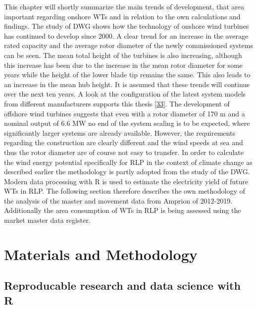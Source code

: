 \documentclass[a4paper,11pt]{article}
\begin{document}
This chapter will shortly summarize the main trends of development, that area important regarding onshore WTs and in relation to the own calculations and findings. The study of DWG shows how the technology of onshore wind turbines has continued to develop since 2000. A clear trend for an increase in the average rated capacity and the average rotor diameter of the newly commissioned systems can be seen. The mean total height of the turbines is also increasing, although this increase has been due to the increase in the mean rotor diameter for some years while the height of the lower blade tip remains the same. This also leads to an increase in the mean hub height. It is assumed that these trends will continue over the next ten years. A look at the configuration of the latest system models from different manufacturers supports this thesis {[}\protect\hyperlink{ref-VestasWindSystemsAS.2019}{33}{]}. The development of offshore wind turbines suggests that even with a rotor diameter of 170 m and a nominal output of 6.6 MW no end of the system scaling is to be expected, where significantly larger systems are already available. However, the requirements regarding the construction are clearly different and the wind speeds at sea and thus the rotor diameter are of course not easy to transfer. In order to calculate the wind energy potential specifically for RLP in the context of climate change as described earlier the methodology is partly adopted from the study of the DWG. Modern data processing with R is used to estimate the electricity yield of future WTs in RLP. The following section therefore describes the own methodology of the analysis of the master and movement data from Amprion of 2012-2019. Additionally the area consumption of WTs in RLP is being assessed using the market master data register.

\newpage

\hypertarget{materials-and-methodology}{%
\section{Materials and Methodology}\label{materials-and-methodology}}

\hypertarget{reproducable-research-and-data-science-with-r}{%
\subsection{Reproducable research and data science with R}\label{reproducable-research-and-data-science-with-r}}
\end{document}
